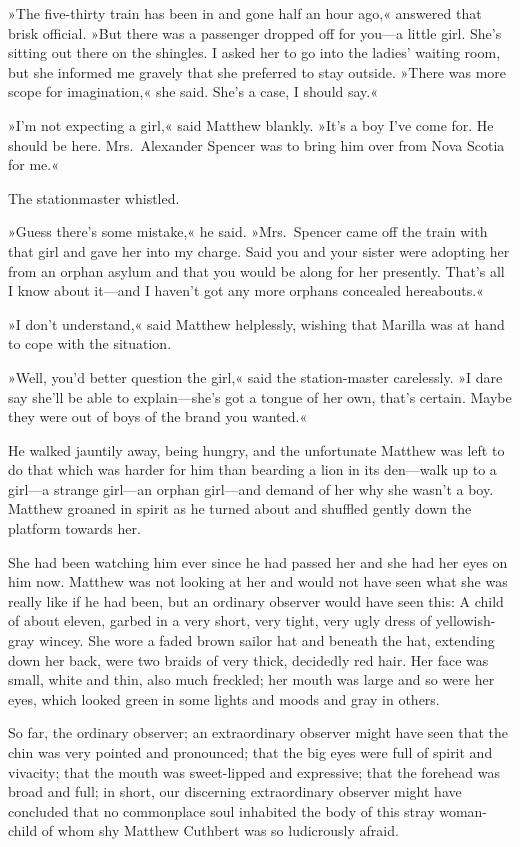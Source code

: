 »The five-thirty train has been in and gone half an hour ago,« answered that brisk official. »But there was a passenger dropped off for you—a little girl. She's sitting out there on the shingles. I asked her to go into the ladies' waiting room, but she informed me gravely that she preferred to stay outside. »There was more scope for imagination,« she said. She's a case, I should say.«

»I'm not expecting a girl,« said Matthew blankly. »It's a boy I've come for. He should be here. Mrs.~Alexander Spencer was to bring him over from Nova Scotia for me.«

The stationmaster whistled.

»Guess there's some mistake,« he said. »Mrs.~Spencer came off the train with that girl and gave her into my charge. Said you and your sister were adopting her from an orphan asylum and that you would be along for her presently. That's all I know about it—and I haven't got any more orphans concealed hereabouts.«

»I don't understand,« said Matthew helplessly, wishing that Marilla was at hand to cope with the situation.

»Well, you'd better question the girl,« said the station-master carelessly. »I dare say she'll be able to explain—she's got a tongue of her own, that's certain. Maybe they were out of boys of the brand you wanted.«

He walked jauntily away, being hungry, and the unfortunate Matthew was left to do that which was harder for him than bearding a lion in its den—walk up to a girl—a strange girl—an orphan girl—and demand of her why she wasn't a boy. Matthew groaned in spirit as he turned about and shuffled gently down the platform towards her.

She had been watching him ever since he had passed her and she had her eyes on him now. Matthew was not looking at her and would not have seen what she was really like if he had been, but an ordinary observer would have seen this: A child of about eleven, garbed in a very short, very tight, very ugly dress of yellowish-gray wincey. She wore a faded brown sailor hat and beneath the hat, extending down her back, were two braids of very thick, decidedly red hair. Her face was small, white and thin, also much freckled; her mouth was large and so were her eyes, which looked green in some lights and moods and gray in others.

So far, the ordinary observer; an extraordinary observer might have seen that the chin was very pointed and pronounced; that the big eyes were full of spirit and vivacity; that the mouth was sweet-lipped and expressive; that the forehead was broad and full; in short, our discerning extraordinary observer might have concluded that no commonplace soul inhabited the body of this stray woman-child of whom shy Matthew Cuthbert was so ludicrously afraid.

